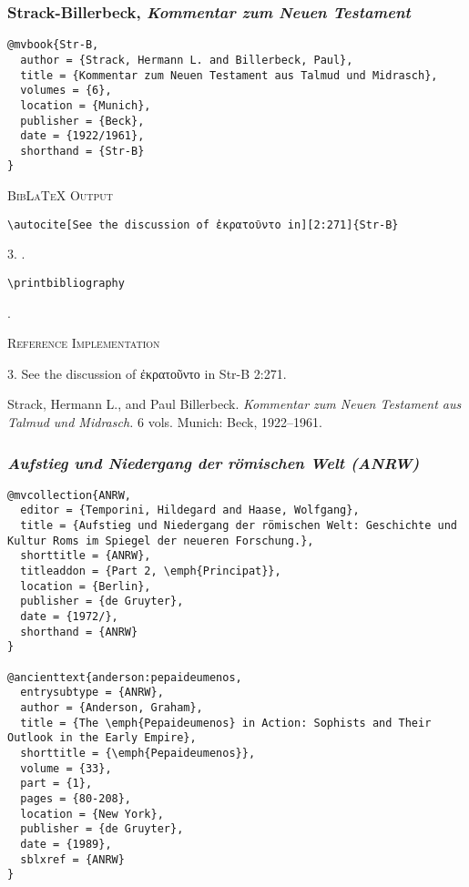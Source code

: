 \documentclass[a4paper]{article}
\newcommand{\gr}[1]{{\greekfont #1}}
\newenvironment{refimp}{%
  \begin{minipage}{\linewidth}
    \setlength{\parskip}{1ex}
    \textsc{Reference Implementation}\par
    \nobreak
    \color{reference-colour}
}{\end{minipage}}
\begin{document}
\subsubsection{Strack-Billerbeck, \emph{Kommentar zum Neuen Testament}}

\begin{lstlisting}
@mvbook{Str-B,
  author = {Strack, Hermann L. and Billerbeck, Paul},
  title = {Kommentar zum Neuen Testament aus Talmud und Midrasch},
  volumes = {6},
  location = {Munich},
  publisher = {Beck},
  date = {1922/1961},
  shorthand = {Str-B}
}
\end{lstlisting}

{\textsc{BibLaTeX Output}\par
   \nobreak
   \texttt{\textbackslash autocite[See the discussion of ἐκρατοῦντο in][2:271]\{Str-B\}}\par
   \color{biblatex-colour}
   3. \cite[See the discussion of \gr{ἐκρατοῦντο} in][2:271]{Str-B}.\par
   \color{black}
   \texttt{\textbackslash printbibliography}\par
   \color{biblatex-colour}
   \hangindent\bibindent{}.\par}

\begin{refimp}
  3. See the discussion of \gr{ἐκρατοῦντο} in Str-B 2:271.

  \hangindent\bibindent Strack, Hermann L., and Paul Billerbeck.
  \emph{Kommentar zum Neuen Testament aus Talmud und Midrasch.} 6 vols.
  Munich: Beck, 1922–1961.
\end{refimp}

\subsubsection{\emph{Aufstieg und Niedergang der römischen Welt (ANRW)}}

\begin{lstlisting}
@mvcollection{ANRW,
  editor = {Temporini, Hildegard and Haase, Wolfgang},
  title = {Aufstieg und Niedergang der römischen Welt: Geschichte und Kultur Roms im Spiegel der neueren Forschung.},
  shorttitle = {ANRW},
  titleaddon = {Part 2, \emph{Principat}},
  location = {Berlin},
  publisher = {de Gruyter},
  date = {1972/},
  shorthand = {ANRW}
}

@ancienttext{anderson:pepaideumenos,
  entrysubtype = {ANRW},
  author = {Anderson, Graham},
  title = {The \emph{Pepaideumenos} in Action: Sophists and Their Outlook in the Early Empire},
  shorttitle = {\emph{Pepaideumenos}},
  volume = {33},
  part = {1},
  pages = {80-208},
  location = {New York},
  publisher = {de Gruyter},
  date = {1989},
  sblxref = {ANRW}
}
\end{lstlisting}
\end{document}
